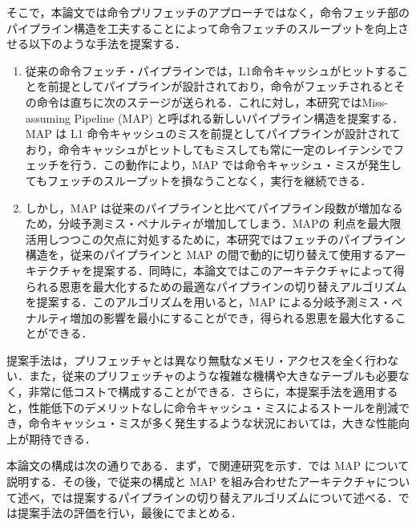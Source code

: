そこで，本論文では命令プリフェッチのアプローチではなく，命令フェッチ部のパイプライン構造を工夫することによって命令フェッチのスループットを向上させる以下のような手法を提案する．
\begin{enumerate}
  \item 従来の命令フェッチ・パイプラインでは，L1命令キャッシュがヒットすることを前提としてパイプラインが設計されており，命令がフェッチされるとその命令は直ちに次のステージが送られる．これに対し，本研究ではMiss-assuming Pipeline (MAP) と呼ばれる新しいパイプライン構造を提案する．MAP は L1 命令キャッシュのミスを前提としてパイプラインが設計されており，命令キャッシュがヒットしてもミスしても常に一定のレイテンシでフェッチを行う．この動作により，MAP では命令キャッシュ・ミスが発生してもフェッチのスループットを損なうことなく，実行を継続できる．
  \item しかし，MAP は従来のパイプラインと比べてパイプライン段数が増加なるため，分岐予測ミス・ペナルティが増加してしまう．MAPの 利点を最大限活用しつつこの欠点に対処するために，本研究ではフェッチのパイプライン構造を，従来のパイプラインと MAP の間で動的に切り替えて使用するアーキテクチャを提案する．同時に，本論文ではこのアーキテクチャによって得られる恩恵を最大化するための最適なパイプラインの切り替えアルゴリズムを提案する．このアルゴリズムを用いると，MAP による分岐予測ミス・ペナルティ増加の影響を最小にすることができ，得られる恩恵を最大化することができる．
\end{enumerate}

提案手法は，プリフェッチャとは異なり無駄なメモリ・アクセスを全く行わない．また，従来のプリフェッチャのような複雑な機構や大きなテーブルも必要なく，非常に低コストで構成することができる．さらに，本提案手法を適用すると，性能低下のデメリットなしに命令キャッシュ・ミスによるストールを削減でき，命令キャッシュ・ミスが多く発生するような状況においては，大きな性能向上が期待できる．

本論文の構成は次の通りである．まず，で関連研究を示す．では MAP について説明する．その後，で従来の構成と MAP を組み合わせたアーキテクチャについて述べ，では提案するパイプラインの切り替えアルゴリズムについて述べる．では提案手法の評価を行い，最後にでまとめる．
